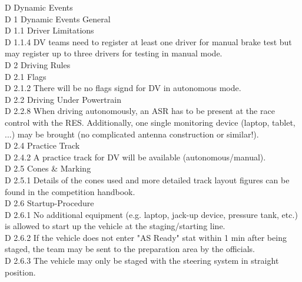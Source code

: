 \documentclass{article}
\begin{document}
D Dynamic Events\\

D 1 Dynamic Events General\\

D 1.1 Driver Limitations\\

D 1.1.4 DV teams need to register at least one driver for manual brake test but may register up to three drivers for testing in manual mode.\\

D 2 Driving Rules\\

D 2.1 Flags\\

D 2.1.2 There will be no flags signd for DV in autonomous mode.\\

D 2.2 Driving Under Powertrain\\

D 2.2.8 When driving autonomously, an ASR has to be present at the race control with the RES. Additionally, one single monitoring device (laptop, tablet, ...) may be brought (no complicated antenna construction or similar!).\\

D 2.4 Practice Track\\

D 2.4.2 A practice track for DV will be available (autonomous/manual).\\

D 2.5 Cones & Marking\\

D 2.5.1 Details of the cones used and more detailed track layout figures can be found in the competition handbook.\\

D 2.6 Startup-Procedure\\

D 2.6.1 No additional equipment (e.g. laptop, jack-up device, pressure tank, etc.) is allowed to start up the vehicle at the staging/starting line.\\

D 2.6.2 If the vehicle does not enter "AS Ready" stat within 1 min after being staged, the team may be sent to the preparation area by the officials.\\

D 2.6.3 The vehicle may only be staged with the steering system in straight position.\\
\end{document}

